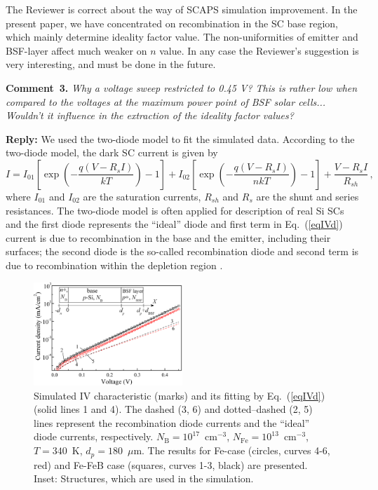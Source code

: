 \documentclass[num-refs]{wiley-article} %
\begin{document}
The Reviewer is correct about the way of SCAPS simulation improvement.
In the present paper, we have concentrated on recombination in the SC base region,
which mainly determine ideality factor value.
The non-uniformities of emitter and  BSF-layer affect much weaker on $n$ value.
In any case the Reviewer’s suggestion is very interesting, and must be done in the 
future. 

\vspace{1cm}
\noindent
\textcolor[rgb]{0.00,0.50,1.00}{\textbf{Comment~3.}}
\emph{Why a voltage sweep restricted to 0.45 V?
This is rather low when compared to the voltages at the maximum power point of BSF solar cells...
Wouldn't it influence in the extraction of the ideality factor values?}

\vspace{0.5cm}
\noindent
\textcolor[rgb]{0.51,0.00,0.00}{\textbf{Reply:}}
We used the two-diode model to fit the simulated data.
According to the two-diode model, the dark SC current is given by
\begin{equation}
\label{eqIVd}
    I=I_{01}\left[\exp\left(-\frac{q(V-R_sI)}{kT}\right)-1\right]
      + I_{02}\left[\exp\left(-\frac{q(V-R_sI)}{nkT}\right)-1\right]
      +\frac{V-R_sI}{R_{sh}}\,,
\end{equation}
where
$I_{01}$ and $I_{02}$ are the saturation currents,
$R_{sh}$ and $R_s$ are the shunt and series resistances.
The two-diode model is often applied for description of real Si SCs
and the first diode represents the ``ideal'' diode and
first term in Eq.~(\ref{eqIVd})
current is due to recombination in the base
and the emitter, including their surfaces;
the second diode is the so-called recombination diode
and second term is due to recombination within
the depletion region \citep{Breitenstein2013}.

\begin{figure}[t]
\centering
\includegraphics[width=0.5\textwidth]{FigIV}
\caption{Simulated IV characteristic (marks)
and its fitting by Eq.~(\ref{eqIVd}) (solid lines 1 and 4).
The dashed (3, 6) and dotted--dashed (2, 5)
lines represent the recombination diode currents and the ``ideal'' diode currents, respectively.
$N_\mathrm{B} = 10^{17}$~cm$^{-3}$, $N_\mathrm{Fe} = 10^{13}$~cm$^{-3}$,
$T = 340$~K, $d_p = 180$~$\mu$m.
The results for Fe-case (circles, curves 4-6, red)
and Fe-FeB case (squares, curves 1-3, black) are presented.
Inset: Structures, which are used in the simulation.
}
\label{fig_IV}
\end{figure}
\end{document}

